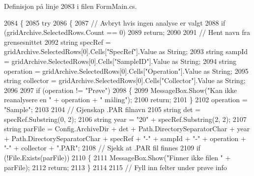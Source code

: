 Definisjon på linje 2083 i filen Form\+Main.\+cs.


\begin{DoxyCode}
2084         \{
2085             \textcolor{keywordflow}{try}
2086             \{
2087                 \textcolor{comment}{// Avbryt hvis ingen analyse er valgt}
2088                 \textcolor{keywordflow}{if} (gridArchive.SelectedRows.Count == 0)
2089                     \textcolor{keywordflow}{return};
2090 
2091                 \textcolor{comment}{// Hent navn fra grensesnittet}
2092                 \textcolor{keywordtype}{string} specRef = gridArchive.SelectedRows[0].Cells[\textcolor{stringliteral}{"SpecRef"}].Value as String;
2093                 \textcolor{keywordtype}{string} sampId = gridArchive.SelectedRows[0].Cells[\textcolor{stringliteral}{"SampleID"}].Value as String;
2094                 \textcolor{keywordtype}{string} operation = gridArchive.SelectedRows[0].Cells[\textcolor{stringliteral}{"Operation"}].Value as String;
2095                 \textcolor{keywordtype}{string} collector = gridArchive.SelectedRows[0].Cells[\textcolor{stringliteral}{"Collector"}].Value as String;
2096 
2097                 \textcolor{keywordflow}{if} (operation != \textcolor{stringliteral}{"Prøve"})
2098                 \{
2099                     MessageBox.Show(\textcolor{stringliteral}{"Kan ikke reanalysere en "} + operation + \textcolor{stringliteral}{" måling"});
2100                     \textcolor{keywordflow}{return};
2101                 \}
2102                 operation = \textcolor{stringliteral}{"Sample"};
2103 
2104                 \textcolor{comment}{// Gjenskap .PAR filnavn}
2105                 \textcolor{keywordtype}{string} det = specRef.Substring(0, 2);
2106                 \textcolor{keywordtype}{string} year = \textcolor{stringliteral}{"20"} + specRef.Substring(2, 2);
2107                 \textcolor{keywordtype}{string} parFile = Config.ArchiveDir + det + Path.DirectorySeparatorChar + year + 
      Path.DirectorySeparatorChar + specRef + \textcolor{stringliteral}{"-"} + sampId + \textcolor{stringliteral}{"-"} + operation + \textcolor{stringliteral}{"-"} + collector + \textcolor{stringliteral}{".PAR"};
2108                 \textcolor{comment}{// Sjekk at .PAR fil finnes}
2109                 \textcolor{keywordflow}{if} (!File.Exists(parFile))
2110                 \{
2111                     MessageBox.Show(\textcolor{stringliteral}{"Finner ikke filen "} + parFile);
2112                     \textcolor{keywordflow}{return};
2113                 \}
2114 
2115                 \textcolor{comment}{// Fyll inn felter under prøve info}

\end{DoxyCode}
